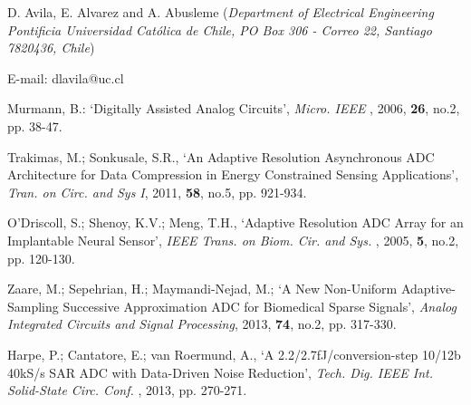 \documentclass[twocolumn]{el-author}
\begin{document}
\vskip3pt

\vskip5pt

\noindent D. Avila, E. Alvarez and A. Abusleme (\textit{Department of Electrical Engineering Pontificia Universidad Cat\'olica de Chile, PO Box 306 - Correo 22, Santiago 7820436, Chile})
\vskip3pt

\noindent E-mail: dlavila@uc.cl

\begin{thebibliography}{}

Murmann, B.: `Digitally Assisted Analog Circuits', \textit{Micro. IEEE} , 2006, \textbf{26}, no.2, pp. 38-47.

Trakimas, M.; Sonkusale, S.R., `An Adaptive Resolution Asynchronous ADC Architecture for Data Compression in Energy Constrained Sensing Applications', \textit{Tran. on Circ. and Sys I}, 2011, \textbf{58}, no.5, pp. 921-934.

O'Driscoll, S.; Shenoy, K.V.; Meng, T.H., `Adaptive Resolution ADC Array for an Implantable Neural Sensor', \textit{IEEE Trans. on Biom. Cir. and Sys.} , 2005, \textbf{5}, no.2, pp. 120-130.

Zaare, M.; Sepehrian, H.;  Maymandi-Nejad, M.; `A New Non-Uniform Adaptive-Sampling Successive Approximation ADC for Biomedical Sparse Signals', \textit{Analog Integrated Circuits and Signal Processing}, 2013, \textbf{74}, no.2, pp. 317-330.

Harpe, P.; Cantatore, E.; van Roermund, A., `A 2.2/2.7fJ/conversion-step 10/12b 40kS/s SAR ADC with Data-Driven Noise Reduction', \textit{Tech. Dig. IEEE Int. Solid-State Circ. Conf.} , 2013, pp. 270-271.


\end{thebibliography}
\end{document}

